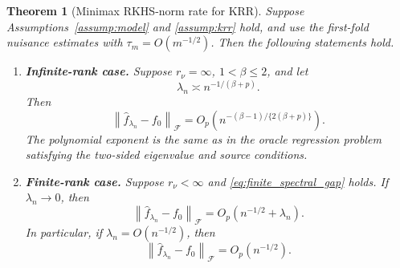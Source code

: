 \documentclass[11pt]{article}
\newtheorem{theorem}{Theorem}[section]
\newcommand{\F}{\mathcal{F}}
\newcommand{\norm}[1]{\left\lVert #1\right\rVert}
\begin{document}
\begin{theorem}[Minimax RKHS-norm rate for KRR]\label{thm:krr_rate}
Suppose Assumptions~\ref{assump:model} and \ref{assump:krr} hold, and use the first-fold nuisance estimates with $\tau_m=O(m^{-1/2})$. Then the following statements hold.

\begin{enumerate}[label=(\roman*),leftmargin=2.2em]
  \item \textbf{Infinite-rank case.} Suppose $r_\nu=\infty$, $1<\beta\le2$, and let
  \[
    \lambda_n\asymp n^{-1/(\beta+p)}.
  \]
  Then
  \begin{equation}
    \norm{\widehat f_{\lambda_n}-f_0}_{\F}
    =O_p\!\left(n^{-(\beta-1)/\{2(\beta+p)\}}\right).
    \label{eq:krr_rate}
  \end{equation}
  The polynomial exponent is the same as in the oracle regression problem satisfying the two-sided eigenvalue and source conditions.

  \item \textbf{Finite-rank case.} Suppose $r_\nu<\infty$ and \eqref{eq:finite_spectral_gap} holds. If $\lambda_n\to0$, then
  \begin{equation}
    \norm{\widehat f_{\lambda_n}-f_0}_{\F}
    =O_p\!\left(n^{-1/2}+\lambda_n\right).
    \label{eq:krr_rate_finite}
  \end{equation}
  In particular, if $\lambda_n=O(n^{-1/2})$, then
  \begin{equation}
    \norm{\widehat f_{\lambda_n}-f_0}_{\F}
    =O_p(n^{-1/2}).
    \label{eq:krr_rate_finite_parametric}
  \end{equation}
\end{enumerate}
\end{theorem}
\end{document}

